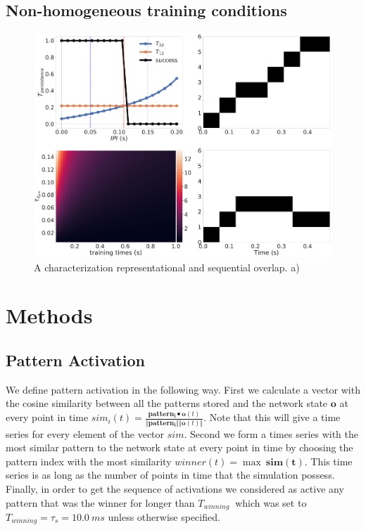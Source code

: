 \documentclass[10pt,a4paper]{article}
\begin{document}
\subsection{Non-homogeneous training conditions}

\begin{figure}[H]
\centering
\includegraphics[scale=0.20]{ipi_non_homogenous.pdf}
\caption{A characterization representational and sequential overlap. a) }
\label{fig:non-homo}
\end{figure}

\section{Methods}

\subsection{Pattern Activation}
We define pattern activation in the following way. First we calculate a vector with the cosine similarity between all the patterns stored and the network state $\mathbf{o}$ at every point in time $sim_i(t) = \frac{\mathbf{pattern_i} \bullet  \mathbf{o}(t)}{\Vert \mathbf{pattern_i} \Vert \Vert \mathbf{o}(t) \Vert}$. Note that this will give a time series for every element of the vector $sim$. Second we form a times series with the most similar pattern to the network state at every point in time by choosing the pattern index with the most similarity $winner(t) = \max \: \mathbf{sim(t)}$. This time series is as long as the number of points in time that the simulation possess. Finally, in order to get the sequence of activations we considered as active any pattern that was the winner for longer than  $T_{winning} \:$ which was set to $T_{winning} = \tau_s = 10.0 \: ms$ unless otherwise specified.   
\end{document}
